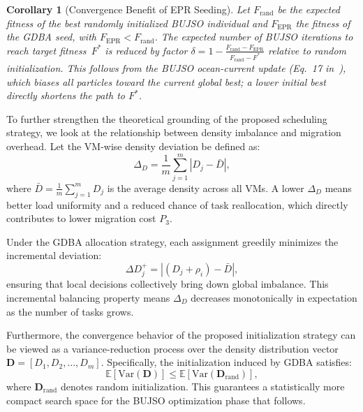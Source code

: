 \documentclass[journal]{IEEEtran}
\newtheorem{corollary}{Corollary}
\begin{document}
\begin{corollary}[Convergence Benefit of EPR Seeding]
\label{cor:conv}
Let $F_{\mathrm{rand}}$ be the expected fitness of the best randomly initialized BUJSO
individual and $F_{\mathrm{EPR}}$ the fitness of the GDBA seed, with
$F_{\mathrm{EPR}}<F_{\mathrm{rand}}$. The expected number of BUJSO iterations to reach
target fitness~$F^*$ is reduced by factor
$\delta=1-\tfrac{F_{\mathrm{rand}}-F_{\mathrm{EPR}}}{F_{\mathrm{rand}}-F^*}$ relative
to random initialization. This follows from the BUJSO ocean-current update
(Eq.~17 in~\cite{pachipala2024}), which biases all particles toward the current global
best; a lower initial best directly shortens the path to $F^*$.
\end{corollary}

To further strengthen the theoretical grounding of the proposed scheduling strategy, we look at the relationship between density imbalance and migration overhead. Let the VM-wise density deviation be defined as:
\begin{equation}
\Delta_D = \frac{1}{m}\sum_{j=1}^{m} \left| D_j - \bar{D} \right|,
\end{equation}
where $\bar{D}=\frac{1}{m}\sum_{j=1}^{m}D_j$ is the average density across all VMs. A lower $\Delta_D$ means better load uniformity and a reduced chance of task reallocation, which directly contributes to lower migration cost $P_3$.

Under the GDBA allocation strategy, each assignment greedily minimizes the incremental deviation:
\begin{equation}
\Delta D_j^{+} = \left| (D_j + \rho_i) - \bar{D} \right|,
\end{equation}
ensuring that local decisions collectively bring down global imbalance. This incremental balancing property means $\Delta_D$ decreases monotonically in expectation as the number of tasks grows.

Furthermore, the convergence behavior of the proposed initialization strategy can be viewed as a variance-reduction process over the density distribution vector $\mathbf{D} = [D_1, D_2, \ldots, D_m]$. Specifically, the initialization induced by GDBA satisfies:
\begin{equation}
\mathbb{E}[\mathrm{Var}(\mathbf{D})] \le \mathbb{E}[\mathrm{Var}(\mathbf{D}_{\mathrm{rand}})],
\end{equation}
where $\mathbf{D}_{\mathrm{rand}}$ denotes random initialization. This guarantees a statistically more compact search space for the BUJSO optimization phase that follows.
\end{document}
